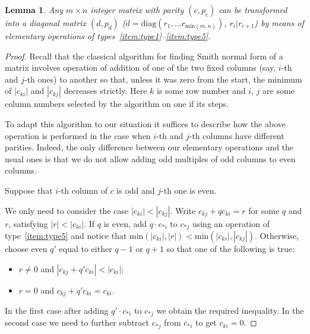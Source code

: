 \documentclass[oneside, 10pt]{amsart}
\theoremstyle{plain}
\newtheorem{lemma}{Lemma}
\theoremstyle{remark}
\theoremstyle{definition}
\begin{document}
\begin{lemma} \label{lm:normal-form} Any $m \times n$ integer matrix with parity $(c, p_c)$ can be transformed into a diagonal matrix $(d, p_d)$
  ($d = \mathrm{diag}(r_1, \ldots r_{\mathrm{min}(m, n)})$, $r_i | r_{i+1}$)
   by means of elementary operations of types~\eqref{item:type1}--\eqref{item:type5}.
\end{lemma}
\begin{proof} 
Recall that the classical algorithm for finding Smith normal form of a matrix involves
 operation of addition of one of the two fixed columns (say, $i$-th and $j$-th ones) to another
 so that, unless it was zero from the start, the minimum of $|c_{ki}|$ and $|c_{kj}|$ decreases strictly. 
 Here $k$ is some row number and $i$, $j$ are some column numbers selected by the algorithm on one if its steps.

To adapt this algorithm to our situation it suffices to describe
 how the above operation is performed in the case when $i$-th and $j$-th columns have different parities.
Indeed, the only difference between our elementary operations and the usual ones is that
 we do not allow adding odd multiples of odd columns to even columns.

Suppose that $i$-th column of $c$ is odd and $j$-th one is even.


We only need to consider the case $|c_{ki}| < |c_{kj}|$. Write $c_{kj} + q c_{ki} = r$ for some $q$ and $r$, satisfying $|r| < |c_{ki}|$.
If $q$ is even, add $q \cdot c_{*i}$ to $c_{*j}$ using an operation of type~\eqref{item:type5} and 
 notice that $\mathrm{min}(|c_{ki}|,|r|) < \mathrm{min}(|c_{ki}|,|c_{kj}|)$.
Otherwise, choose even $q'$ equal to either $q-1$ or $q+1$ so that one of the following is true:
\begin{itemize}
 \item $r\neq 0$ and $|c_{kj} + q' c_{ki}| < |c_{ki}|$;
 \item $r = 0$ and $c_{kj} + q' c_{ki} = c_{ki}$.
\end{itemize}
In the first case after adding $q' \cdot c_{*i}$ to $c_{*j}$ we obtain the required inequality.
In the second case we need to further subtract $c_{*j}$ from $c_{*i}$ to get $c_{ki} = 0$.
\end{proof}
\end{document}
